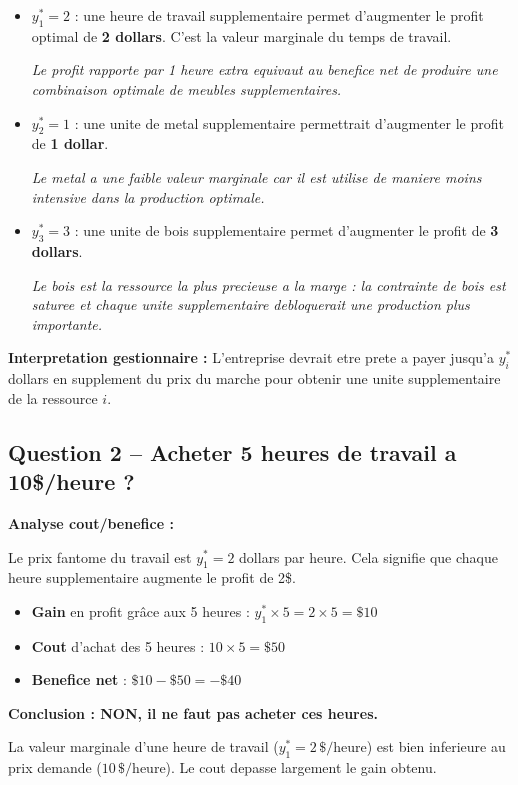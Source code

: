 \documentclass[12pt,a4paper]{article}
\begin{document}
\begin{correction}
\begin{itemize}
    \item $y_1^* = 2$ : une heure de travail supplementaire permet d'augmenter le profit optimal de \textcolor{defvert}{\textbf{2 dollars}}. C'est la valeur marginale du temps de travail.
    
    \textit{Le profit rapporte par 1 heure extra equivaut au benefice net de produire une combinaison optimale de meubles supplementaires.}
    
    \item $y_2^* = 1$ : une unite de metal supplementaire permettrait d'augmenter le profit de \textcolor{defvert}{\textbf{1 dollar}}.
    
    \textit{Le metal a une faible valeur marginale car il est utilise de maniere moins intensive dans la production optimale.}
    
    \item $y_3^* = 3$ : une unite de bois supplementaire permet d'augmenter le profit de \textcolor{defvert}{\textbf{3 dollars}}.
    
    \textit{Le bois est la ressource la plus precieuse a la marge : la contrainte de bois est saturee et chaque unite supplementaire debloquerait une production plus importante.}
\end{itemize}

\textbf{Interpretation gestionnaire :} L'entreprise devrait etre prete a payer jusqu'a $y_i^*$ dollars en supplement du prix du marche pour obtenir une unite supplementaire de la ressource $i$.
\end{correction}

\subsection{Question 2 -- Acheter 5 heures de travail a 10\$/heure ?}

\begin{correction}
\textbf{Analyse cout/benefice :}

Le prix fantome du travail est $y_1^* = 2$ dollars par heure. Cela signifie que chaque heure supplementaire augmente le profit de 2\$.

\begin{itemize}
    \item \textbf{Gain} en profit grâce aux 5 heures : $y_1^* \times 5 = 2 \times 5 = \$10$
    \item \textbf{Cout} d'achat des 5 heures : $10 \times 5 = \$50$
    \item \textbf{Benefice net} : $\$10 - \$50 = -\$40$
\end{itemize}

\textcolor{importantrouge}{\textbf{Conclusion : NON, il ne faut pas acheter ces heures.}}

La valeur marginale d'une heure de travail ($y_1^* = 2\,\$/\text{heure}$) est bien inferieure au prix demande ($10\,\$/\text{heure}$). Le cout depasse largement le gain obtenu.
\end{correction}
\end{document}
